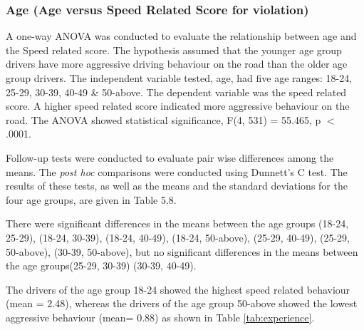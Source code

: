 \documentclass[preprint,12pt,a4paper,authoryear]{elsarticle}
\begin{document}
\begin{linenumbers}
\subsubsection{Age (Age versus Speed Related Score for violation) }

A one-way ANOVA was conducted to evaluate the relationship between age and the Speed related score. The hypothesis assumed that the younger age group drivers have more aggressive driving behaviour on the road than the older age group drivers. The independent variable tested, age, had five age ranges: 18-24, 25-29, 30-39, 40-49 \& 50-above. The dependent variable was the speed related score. A higher speed related score indicated more aggressive behaviour on the road. The ANOVA showed statistical significance, F(4, 531) = 55.465, p $<$ .0001.

Follow-up tests were conducted to evaluate pair wise differences among the means. The \textit{post hoc} comparisons were conducted using Dunnett's C test. The results of these tests, as well as the means and the standard deviations for the four age groups, are given in Table 5.8. 

There were significant differences in the means between the age groups (18-24, 25-29), (18-24, 30-39), (18-24, 40-49), (18-24, 50-above), (25-29, 40-49), (25-29, 50-above), (30-39, 50-above),  but no significant differences in the means between the age groups(25-29, 30-39) (30-39, 40-49). 

The drivers of the age group 18-24 showed the highest speed related behaviour (mean = 2.48), whereas the drivers of the age group 50-above showed the lowest aggressive behaviour (mean= 0.88) as shown in Table \ref{tab:experience}.


\end{linenumbers}
\end{document}
